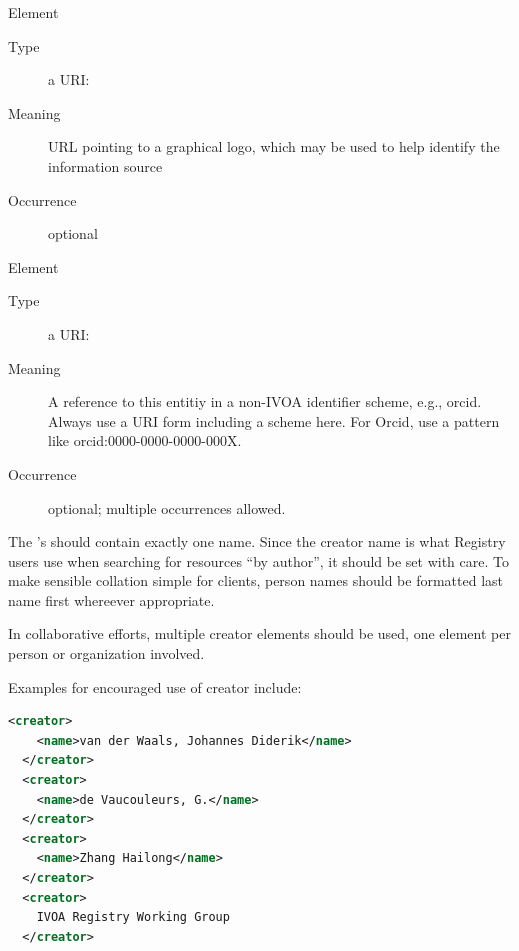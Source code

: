 \documentclass[11pt,a4paper]{ivoa}
\begin{document}
\begin{generated}
\begin{bigdescription}
\begin{description}
\end{description}
\item[Element \xmlel{logo}]
\begin{description}
\item[Type] a URI: 
\item[Meaning] 
                URL pointing to a graphical logo, which may be used to help 
                identify the information source
              
\item[Occurrence] optional

\end{description}
\item[Element \xmlel{altIdentifier}]
\begin{description}
\item[Type] a URI: 
\item[Meaning] 
                  A reference to this entitiy in a non-IVOA identifier
                  scheme, e.g., orcid.  Always use a URI form including
                  a scheme here.  For Orcid, use a pattern like
                  orcid:0000-0000-0000-000X.
               
\item[Occurrence] optional; multiple occurrences allowed.

\end{description}


\end{bigdescription}\endgroup

\endgroup
\end{generated}


The 's  should contain exactly one name.
Since the creator name is what Registry users use when searching for
resources ``by author'', it should be set with care.  To make sensible
collation simple for clients, person names should be formatted last name
first whereever appropriate.

In collaborative efforts, multiple creator elements should be used, one
element per person or organization involved.

Examples for encouraged use of creator include:

\begin{lstlisting}[language=XML,basicstyle=\footnotesize]
  <creator>
    <name>van der Waals, Johannes Diderik</name>
  </creator>
  <creator>
    <name>de Vaucouleurs, G.</name>
  </creator>
  <creator>
    <name>Zhang Hailong</name>
  </creator>
  <creator>
    IVOA Registry Working Group
  </creator>
\end{lstlisting}
\end{document}
